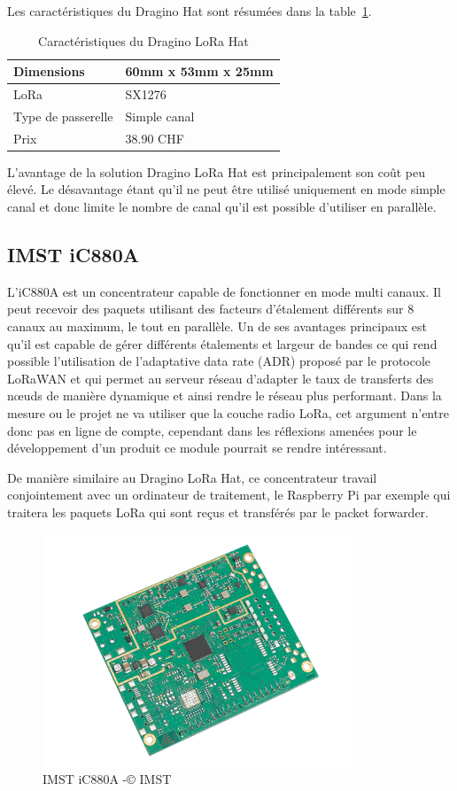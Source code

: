 Les caractéristiques du Dragino Hat sont résumées dans la table~\ref{tab:dragino_cara}.

\begin{table}[htb]
\caption[Caractéristiques du Dragino LoRa Hat]{Caractéristiques du Dragino LoRa Hat}
\label{tab:dragino_cara}
\centering
\begin{tabular}{ l | l }
\toprule
Dimensions & 60mm x 53mm x 25mm \\
\midrule
LoRa & SX1276 \\
\midrule
Type de passerelle & Simple canal \\
\midrule
Prix & 38.90 CHF \\
\bottomrule
\end{tabular}
\end{table}

L’avantage de la solution Dragino LoRa Hat est principalement son coût peu élevé. Le désavantage étant qu’il ne peut être utilisé uniquement en mode simple canal et donc limite le nombre de canal qu’il est possible d’utiliser en parallèle.

\subsection {IMST iC880A}

L’iC880A est un concentrateur capable de fonctionner en mode multi canaux. Il peut recevoir des paquets utilisant des facteurs d’étalement différents sur 8 canaux au maximum, le tout en parallèle. Un de ses avantages principaux est qu’il est capable de gérer différents étalements et largeur de bandes ce qui rend possible l’utilisation de l’adaptative data rate (ADR) proposé par le protocole LoRaWAN et qui permet au serveur réseau d’adapter le taux de transferts des nœuds de manière dynamique et ainsi rendre le réseau plus performant. Dans la mesure ou le projet ne va utiliser que la couche radio LoRa, cet argument n’entre donc pas en ligne de compte, cependant dans les réflexions amenées pour le développement d'un produit ce module pourrait se rendre intéressant.

De manière similaire au Dragino LoRa Hat, ce concentrateur travail conjointement avec un ordinateur de traitement, le Raspberry Pi par exemple qui traitera les paquets LoRa qui sont reçus et transférés par le packet forwarder.

\begin{figure}[htb]
\centering 
\includegraphics[width=0.5\columnwidth]{../images/iC880A.png} 
\caption[IMST iC880A]{IMST iC880A -© IMST}
\label{fig:imst_ic880a}
\end{figure}

